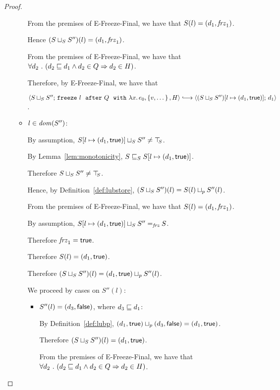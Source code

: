 \begin{proof}
\begin{itemize}
\begin{itemize}
        From the premises of {\sc E-Freeze-Final}, we have that $S(l)
        = (d_1, \mathit{frz}_1)$.

        Hence $(S \sqcup_{S} S'')(l) = (d_1, \mathit{frz}_1)$.

        From the premises of {\sc E-Freeze-Final}, we have that
        $\forall{d_2} ~.~ ( {d_2 \sqsubseteq d_1 \land d_2 \in Q} \Rightarrow d_2 \in
        H)$.

        Therefore, by {\sc E-Freeze-Final}, we have that

        $\config{\lubstore{S}{S''}}{\freezeafterfull{l}{Q}{\lam{x}{e_0}}{\setof{v,
              \dots}}{H}} \parstepsto
        \config{\extS{(\lubstore{S}{S''})}{l}{d_1}{\frozentrue}}{d_1}$.


      \item $l \in \mathit{dom}(S'')$:

        By assumption, $S[l \mapsto (d_1, \textsf{true})] \sqcup_{S} S''
        \neq \top\hspace{-0.85mm}_{S}$.

        By Lemma~\ref{lem:monotonicity},
        $S \sqsubseteq_S S[l \mapsto (d_1, \textsf{true})]$.

        Therefore $S \sqcup_{S} S'' \neq \top\hspace{-0.85mm}_{S}$.

        Hence, by Definition~\ref{def:lubstore},
        $(S \sqcup_{S} S'')(l) = S(l) \sqcup_p S''(l)$.

        From the premises of {\sc E-Freeze-Final}, we have that
        $S(l) = (d_1, \mathit{frz}_1)$.

        By assumption, $S[l \mapsto (d_1, \textsf{true})] \sqcup_{S} S''
        =_{\textit{frz}} S$.

        Therefore $\mathit{frz}_1 = \textsf{true}$.

        Therefore $S(l) = (d_1, \textsf{true})$.

        Therefore $(S \sqcup_{S} S'')(l) =
        (d_1, \textsf{true}) \sqcup_p S''(l)$.

        We proceed by cases on $S''(l)$:
        \begin{itemize}
        \item $S''(l) = (d_3, \textsf{false})$, where $d_3 \sqsubseteq d_1$:

          By Definition~\ref{def:lubp},
          $(d_1, \textsf{true}) \sqcup_p (d_3, \textsf{false})
          = (d_1, \textsf{true})$.

          Therefore $(S \sqcup_{S} S'')(l) =
          (d_1, \textsf{true})$.

          From the premises of {\sc E-Freeze-Final}, we have that
          $\forall{d_2} ~.~ ( {d_2 \sqsubseteq d_1 \land d_2 \in Q} \Rightarrow d_2 \in
          H)$.


\end{itemize}
\end{itemize}
\end{itemize}
\end{proof}
